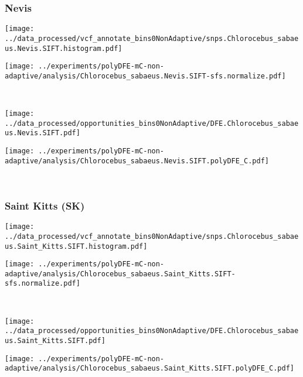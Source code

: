 \subsubsection{Nevis}

\begin{minipage}{0.49\linewidth}
    \texttt{[image: ../data\_processed/vcf\_annotate\_bins0NonAdaptive/snps.Chlorocebus\_sabaeus.Nevis.SIFT.histogram.pdf]}
\end{minipage}
\begin{minipage}{0.49\linewidth}
    \texttt{[image: ../experiments/polyDFE-mC-non-adaptive/analysis/Chlorocebus\_sabaeus.Nevis.SIFT-sfs.normalize.pdf]}
\end{minipage}
\\
\begin{minipage}{0.49\linewidth}
    \texttt{[image: ../data\_processed/opportunities\_bins0NonAdaptive/DFE.Chlorocebus\_sabaeus.Nevis.SIFT.pdf]}
\end{minipage}
\begin{minipage}{0.49\linewidth}
    \texttt{[image: ../experiments/polyDFE-mC-non-adaptive/analysis/Chlorocebus\_sabaeus.Nevis.SIFT.polyDFE\_C.pdf]}
\end{minipage}
\\

\subsubsection{Saint Kitts (SK)}

\begin{minipage}{0.49\linewidth}
    \texttt{[image: ../data\_processed/vcf\_annotate\_bins0NonAdaptive/snps.Chlorocebus\_sabaeus.Saint\_Kitts.SIFT.histogram.pdf]}
\end{minipage}
\begin{minipage}{0.49\linewidth}
    \texttt{[image: ../experiments/polyDFE-mC-non-adaptive/analysis/Chlorocebus\_sabaeus.Saint\_Kitts.SIFT-sfs.normalize.pdf]}
\end{minipage}
\\
\begin{minipage}{0.49\linewidth}
    \texttt{[image: ../data\_processed/opportunities\_bins0NonAdaptive/DFE.Chlorocebus\_sabaeus.Saint\_Kitts.SIFT.pdf]}
\end{minipage}
\begin{minipage}{0.49\linewidth}
    \texttt{[image: ../experiments/polyDFE-mC-non-adaptive/analysis/Chlorocebus\_sabaeus.Saint\_Kitts.SIFT.polyDFE\_C.pdf]}
\end{minipage}
\\

